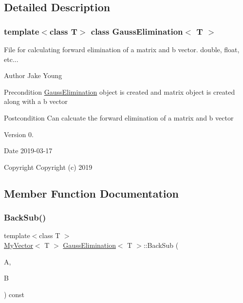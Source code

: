 \subsection{Detailed Description}
\subsubsection*{template$<$class T$>$\newline
class Gauss\+Elimination$<$ T $>$}

File for calculating forward elimination of a matrix and b vector. double, float, etc... 

\begin{DoxyAuthor}{Author}
Jake Young 
\end{DoxyAuthor}
\begin{DoxyPrecond}{Precondition}
\mbox{\hyperlink{class_gauss_elimination}{Gauss\+Elimination}} object is created and matrix object is created along with a b vector 
\end{DoxyPrecond}
\begin{DoxyPostcond}{Postcondition}
Can calcuate the forward elimination of a matrix and b vector 
\end{DoxyPostcond}
\begin{DoxyVersion}{Version}
0. 
\end{DoxyVersion}
\begin{DoxyDate}{Date}
2019-\/03-\/17
\end{DoxyDate}
\begin{DoxyCopyright}{Copyright}
Copyright (c) 2019 
\end{DoxyCopyright}


\subsection{Member Function Documentation}
\mbox{\label{class_gauss_elimination_a6aa34564f311767a5c7eec37306f9ca3}} 
\subsubsection{\texorpdfstring{BackSub()}{BackSub()}}
{\footnotesize\ttfamily template$<$class T $>$ \\
\mbox{\hyperlink{class_my_vector}{My\+Vector}}$<$ T $>$ \mbox{\hyperlink{class_gauss_elimination}{Gauss\+Elimination}}$<$ T $>$\+::Back\+Sub (\begin{DoxyParamCaption}\item[{const \mbox{\hyperlink{class_matrix}{Matrix}}$<$ T $>$ \&}]{A,  }\item[{const \mbox{\hyperlink{class_my_vector}{My\+Vector}}$<$ T $>$ \&}]{B }\end{DoxyParamCaption}) const}



